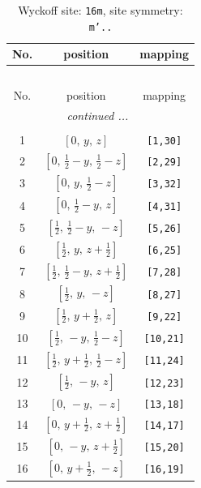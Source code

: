 \documentclass[fleqn,8pt]{jsarticle}
\begin{document}
\renewcommand{\arraystretch}{1.2}
\begin{longtable}{ccc}
\caption{Wyckoff site: {\tt 16m}, site symmetry: {\tt m'..}}
 \\
 \hline \hline
No. & position & mapping \\ \hline \endfirsthead

\multicolumn{2}{l}{\tablename\ \thetable{}} \\
 \hline \hline
No. & position & mapping \\ \hline \endhead

 \hline \hline
\multicolumn{2}{r}{\footnotesize\it continued ...} \\ \endfoot

 \hline \hline
\multicolumn{2}{r}{} \\ \endlastfoot

1 & $\left[ 0,\, y,\, z \right]$ & {\tt [1,30]} \\ \hline
2 & $\left[ 0,\, \frac{1}{2} - y,\, \frac{1}{2} - z \right]$ & {\tt [2,29]} \\ \hline
3 & $\left[ 0,\, y,\, \frac{1}{2} - z \right]$ & {\tt [3,32]} \\ \hline
4 & $\left[ 0,\, \frac{1}{2} - y,\, z \right]$ & {\tt [4,31]} \\ \hline
5 & $\left[ \frac{1}{2},\, \frac{1}{2} - y,\, - z \right]$ & {\tt [5,26]} \\ \hline
6 & $\left[ \frac{1}{2},\, y,\, z + \frac{1}{2} \right]$ & {\tt [6,25]} \\ \hline
7 & $\left[ \frac{1}{2},\, \frac{1}{2} - y,\, z + \frac{1}{2} \right]$ & {\tt [7,28]} \\ \hline
8 & $\left[ \frac{1}{2},\, y,\, - z \right]$ & {\tt [8,27]} \\ \hline
9 & $\left[ \frac{1}{2},\, y + \frac{1}{2},\, z \right]$ & {\tt [9,22]} \\ \hline
10 & $\left[ \frac{1}{2},\, - y,\, \frac{1}{2} - z \right]$ & {\tt [10,21]} \\ \hline
11 & $\left[ \frac{1}{2},\, y + \frac{1}{2},\, \frac{1}{2} - z \right]$ & {\tt [11,24]} \\ \hline
12 & $\left[ \frac{1}{2},\, - y,\, z \right]$ & {\tt [12,23]} \\ \hline
13 & $\left[ 0,\, - y,\, - z \right]$ & {\tt [13,18]} \\ \hline
14 & $\left[ 0,\, y + \frac{1}{2},\, z + \frac{1}{2} \right]$ & {\tt [14,17]} \\ \hline
15 & $\left[ 0,\, - y,\, z + \frac{1}{2} \right]$ & {\tt [15,20]} \\ \hline
16 & $\left[ 0,\, y + \frac{1}{2},\, - z \right]$ & {\tt [16,19]} \\
\end{longtable}
\end{document}
